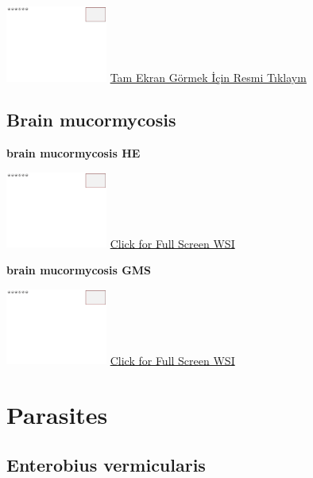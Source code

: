 \documentclass[
  letterpaper,
  paper=6in:9in,
  pagesize=pdftex,
  headinclude=on,
  footinclude=on,
  12pt]{scrbook}
\begin{document}
\href{https://images.patolojiatlasi.com/template/HE.html}{\includegraphics[width=0.25\textwidth,height=\textheight]{./screenshots/template_screenshot.png}}
\href{https://images.patolojiatlasi.com/candidaalbicans/cervicovaginalsmear/viewer_z0.html}{Tam
Ekran Görmek İçin Resmi Tıklayın}

\hypertarget{sec-brain-mucormycosis}{%
\section{Brain mucormycosis}\label{sec-brain-mucormycosis}}

\textbf{brain mucormycosis HE}

\href{https://images.patolojiatlasi.com/template/HE.html}{\includegraphics[width=0.25\textwidth,height=\textheight]{./screenshots/template_screenshot.png}}
\href{https://images.patolojiatlasi.com/brain-mucormycosis/HE.html}{Click
for Full Screen WSI}

\textbf{brain mucormycosis GMS}

\href{https://images.patolojiatlasi.com/template/HE.html}{\includegraphics[width=0.25\textwidth,height=\textheight]{./screenshots/template_screenshot.png}}
\href{https://images.patolojiatlasi.com/brain-mucormycosis/HE.html}{Click
for Full Screen WSI}

\hypertarget{sec-parasites}{%
\chapter{Parasites}\label{sec-parasites}}

\hypertarget{sec-enterobius-vermicularis}{%
\section{Enterobius vermicularis}\label{sec-enterobius-vermicularis}}
\end{document}

